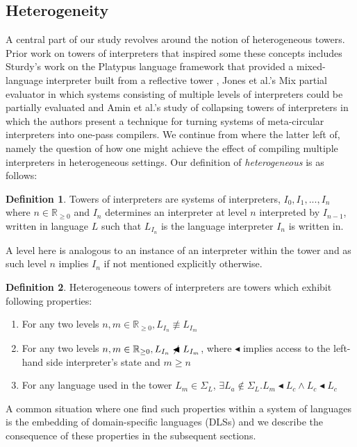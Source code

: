 \documentclass{article}
\theoremstyle{definition}
\newtheorem{definition}{Definition}[section]
\begin{document}
\subsection{Heterogeneity}
A central part of our study revolves around the notion of heterogeneous towers. Prior work on towers of interpreters that inspired some these concepts includes Sturdy's work on the Platypus language framework that provided a mixed-language interpreter built from a reflective tower \cite{sturdy1993lisp}, Jones et al.'s Mix partial evaluator \cite{jones1989mix} in which systems consisting of multiple levels of interpreters could be partially evaluated and Amin et al.'s study of collapsing towers of interpreters in which the authors present a technique for turning systems of meta-circular interpreters into one-pass compilers. We continue from where the latter left of, namely the question of how one might achieve the effect of compiling multiple interpreters in heterogeneous settings. Our definition of \textit{heterogeneous} is as follows:
\theoremstyle{definition}
\begin{definition}
	Towers of interpreters are systems of interpreters, $I_0, I_1, ..., I_n$ where $n \in \mathbb R_{\ge 0}$ and $I_n$ determines an interpreter at level $n$ interpreted by $I_{n-1}$, written in language $L$ such that $L_{I_n}$ is the language interpreter $I_n$ is written in.
\end{definition}

A level here is analogous to an instance of an interpreter within the tower and as such level $n$ implies $I_n$ if not mentioned explicitly otherwise.

\begin{definition}
	Heterogeneous towers of interpreters are towers which exhibit following properties:
	\begin{enumerate}
		\item For any two levels $n, m \in \mathbb R_{\ge 0}, L_{I_n} \not\equiv L_{I_m}$
		\item For any two levels $n, m \in \mathbb R_{\ge 0}, L_{I_n} \not\blacktriangleleft L_{I_m}$, where $\blacktriangleleft$ implies access to the left-hand side interpreter's state and $m \ge n$
		\item For any language used in the tower $L_m \in \Sigma_L$, $\exists L_a \not\in \Sigma_L.L_m \blacktriangleleft L_c \land L_c \blacktriangleleft L_c$
	\end{enumerate}
\end{definition}\label{def:het}
A common situation where one find such properties within a system of languages is the embedding of domain-specific languages (DLSs) and we describe the consequence of these properties in the subsequent sections.
\end{document}
